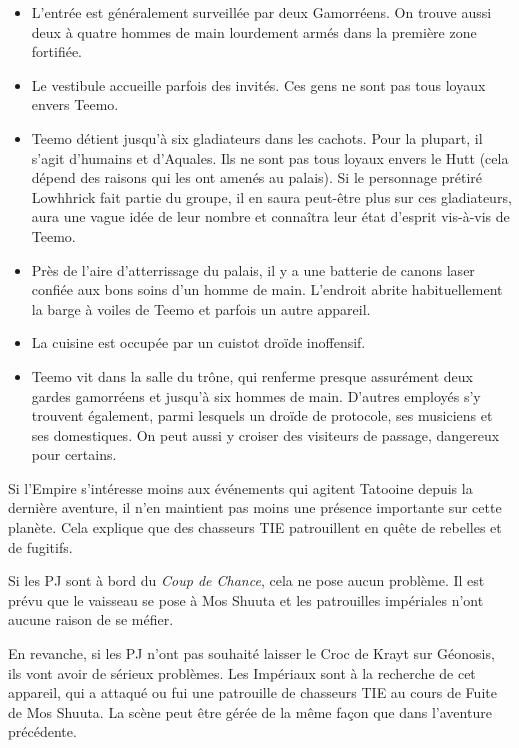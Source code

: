\documentclass[a4paper,10pt,twoside,twocolumn,openany]{book}
\begin{document}
\begin{itemize}
    \item L’entrée est généralement surveillée par deux Gamorréens. On trouve aussi deux à quatre hommes
de main lourdement armés dans la première zone
fortifiée.
    \item Le vestibule accueille parfois des invités. Ces gens
ne sont pas tous loyaux envers Teemo.
    \item Teemo détient jusqu’à six gladiateurs dans les
cachots. Pour la plupart, il s’agit d’humains et
d’Aquales. Ils ne sont pas tous loyaux envers le
Hutt (cela dépend des raisons qui les ont amenés
au palais). Si le personnage prétiré Lowhhrick fait
partie du groupe, il en saura peut-être plus sur ces
gladiateurs, aura une vague idée de leur nombre et
connaîtra leur état d’esprit vis-à-vis de Teemo.
    \item Près de l’aire d’atterrissage du palais, il y a une batterie de canons laser confiée aux bons soins d’un
homme de main. L’endroit abrite habituellement la
barge à voiles de Teemo et parfois un autre appareil.
    \item La cuisine est occupée par un cuistot droïde inoffensif.
    \item Teemo vit dans la salle du trône, qui renferme
presque assurément deux gardes gamorréens et
jusqu’à six hommes de main. D’autres employés
s’y trouvent également, parmi lesquels un droïde
de protocole, ses musiciens et ses domestiques. On
peut aussi y croiser des visiteurs de passage, dangereux pour certains.
\end{itemize}

\subtitle{LE CORDON IMPÉRIAL}

Si l’Empire s’intéresse moins aux événements qui agitent
Tatooine depuis la dernière aventure, il n’en maintient
pas moins une présence importante sur cette planète.
Cela explique que des chasseurs TIE patrouillent en
quête de rebelles et de fugitifs.

Si les PJ sont à bord du \emph{Coup de Chance}, cela ne pose
aucun problème. Il est prévu que le vaisseau se pose à
Mos Shuuta et les patrouilles impériales n’ont aucune
raison de se méfier.

En revanche, si les PJ n’ont pas souhaité laisser le Croc de Krayt sur Géonosis, ils vont avoir de sérieux problèmes. Les Impériaux sont à la recherche de cet appareil, qui a attaqué ou fui une patrouille de chasseurs TIE
au cours de Fuite de Mos Shuuta. La scène peut être
gérée de la même façon que dans l’aventure précédente.
\end{document}
